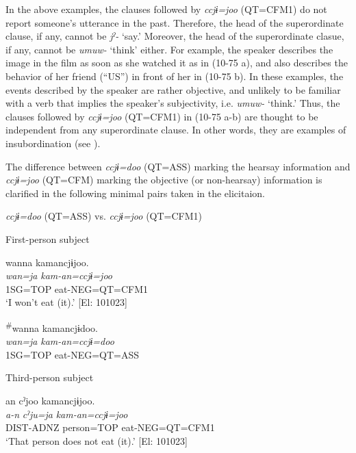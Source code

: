 \begin{xlist}
In the above examples, the clauses followed by \textit{ccjɨ=joo} (QT=CFM1) do not report someone’s utterance in the past. Therefore, the head of the superordinate clause, if any, cannot be \textit{jˀ-} ‘say.’ Moreover, the head of the superordinate clasue, if any, cannot be \textit{umuw-} ‘think’ either. For example, the speaker describes the image in the film as soon as she watched it as in (10-75 a), and also describes the behavior of her friend (“US”) in front of her in (10-75 b). In these examples, the events described by the speaker are rather objective, and unlikely to be familiar with a verb that implies the speaker’s subjectivity, i.e. \textit{umuw-} ‘think.’ Thus, the clauses followed by \textit{ccjɨ=joo} (QT=CFM1) in (10-75 a-b) are thought to be independent from any superordinate clause. In other words, they are examples of insubordination (see ).

  The difference between \textit{ccjɨ=doo} (QT=ASS) marking the hearsay information and \textit{ccjɨ=joo} (QT=CFM) marking the objective (or non-hearsay) information is clarified in the following minimal pairs taken in the elicitaion.

\ea\label{ex:10.76}   \textit{ccjɨ=doo} (QT=ASS) vs. \textit{ccjɨ=joo} (QT=CFM1)\\
  \begin{xlist}
  \exi{} First-person subject

  \ex  %
      \glll    wanna  kamancjɨjoo.  \\
      \textit{wan=ja}  \textit{kam-an=ccjɨ=joo}  \\
      1SG=TOP  eat-NEG=QT=CFM1  \\
      \glt       ‘I won’t eat (it).’ [El: 101023]

  \ex  %
      \glll    \textsuperscript{\#}wanna  kamancjɨdoo.\\
      \textit{wan=ja}  \textit{kam-an=ccjɨ=doo}\\
      1SG=TOP  eat-NEG=QT=ASS\\
      \glt [El: 101023]

  \exi{} Third-person subject

  \ex  %
      \glll     an  cˀjoo  kamancjɨjoo.\\
      \textit{a-n}  \textit{cˀju=ja}  \textit{kam-an=ccjɨ=joo}\\
      DIST-ADNZ  person=TOP  eat-NEG=QT=CFM1\\
      \glt        ‘That person does not eat (it).’ [El: 101023]


\end{xlist}
\end{xlist}
